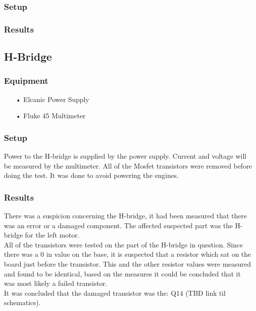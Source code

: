 \subsubsection{Setup}

\subsubsection{Results}

\subsection{H-Bridge}

\subsubsection{Equipment}
\begin{enumerate}
	\item[•]Elcanic Power Supply
	\item[•]Fluke 45 Multimeter
\end{enumerate}

\subsubsection{Setup}
Power to the H-bridge is supplied by the power supply. Current and voltage will be measured by the multimeter.
All of the Mosfet transistors were removed before doing the test. It was done to avoid powering the engines.


\subsubsection{Results}
There was a suspicion concerning the H-bridge, it had been measured that there was an error or a damaged component. The affected suspected part was the H-bridge for the left motor.\\

All of the transistors were tested on the part of the H-bridge in question.
Since there was a 0 in value on the base, it is suspected that a resistor which sat on the board just before the transistor. This and the other resistor values were measured and found to be identical, based on the measures it could be concluded that it was most likely a failed transistor.\\

It was concluded that the damaged transistor was the: Q14 \cite{Q14}  
(TBD link til schematics).\\

